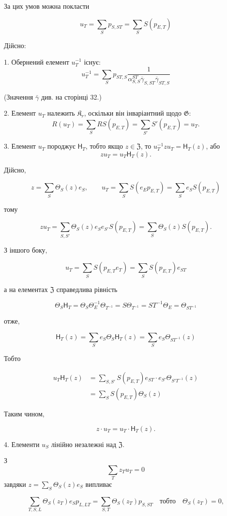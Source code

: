 \documentclass[11pt]{article}
\begin{document}
За цих умов можна покласти

\[
u_T=\sum_S p_{S,ST}=\sum_S S(p_{E,T})
\]

Дійсно:

1. Обернений елемент \(u_T^{-1}\) існує:
\[
u_T^{-1}=\sum_S p_{ST,S}
\frac{1}{\alpha_{S,S}^{ST}\overline{\gamma}_{S,ST}\overline{\gamma}_{ST,S}}
\]

(Значення \(\bar{\gamma}\) див. на сторінці 32.)

2. Елемент \(u_T\) належить \(\mathfrak K_r\), оскільки він інваріантний щодо \(\mathfrak G\):
\[
R(u_T)=\sum_S RS(p_{E,T})=\sum_{S'} S'(p_{E,T})=u_T.
\]

3. Елемент \(u_T\) породжує \(\mathsf{H}_T\), тобто якщо \(z\in\mathfrak Z\), то \(u_T^{-1}zu_T=\mathsf{H}_T(z)\), або
\[
z u_T=u_T \mathsf{H}_T(z).
\]

Дійсно,

\[
z=\sum_S\Theta_S(z)e_S,\qquad
u_T=\sum_S S(e_Ep_{E,T})=\sum_S e_S S(p_{E,T})
\]

тому

\[
zu_T=\sum_{S,S'}\Theta_S(z)e_Se_{S'}S(p_{E,T})
=\sum_S\Theta_S(z)S(p_{E,T}).
\]

З іншого боку,

\[
u_T=\sum_S S(p_{E,T}e_T)=\sum_S S(p_{E,T})e_{ST}
\]

а на елементах \(\mathfrak Z\) справедлива рівність

\[
\Theta_S \mathsf{H}_T=\Theta_S\Theta_E^{-1}\Theta_{T^{-1}}
=S\Theta_{T^{-1}}=ST^{-1}\Theta_E=\Theta_{ST^{-1}}
\]

отже,

\[
\mathsf{H}_T(z)=\sum_S e_S\Theta_S \mathsf{H}_T(z)=\sum_S e_S\Theta_{ST^{-1}}(z)
\]

Тобто

\[
\begin{aligned}
u_T\mathsf{H}_T(z)
&=\sum_{S,S'} S(p_{E,T})e_{ST}\cdot e_{S'}\Theta_{S'T^{-1}}(z)\\
&=\sum_S S(p_{E,T})\Theta_S(z)
\end{aligned}
\]

Таким чином,

\[
z\cdot u_T=u_T\cdot \mathsf{H}_T(z).
\]

4. Елементи \(u_S\) лінійно незалежні над \(\mathfrak Z\).

З
\[
\sum_T z_Tu_T=0
\]
завдяки \(z=\sum_S\Theta_S(z)e_S\) випливає

\[
\sum_{T,S,L}\Theta_S(z_T)e_Sp_{L,LT}
=\sum_{S,T}\Theta_S(z_T)p_{S,ST}\quad\text{тобто}\quad
\Theta_S(z_T)=0,
\]
\end{document}

